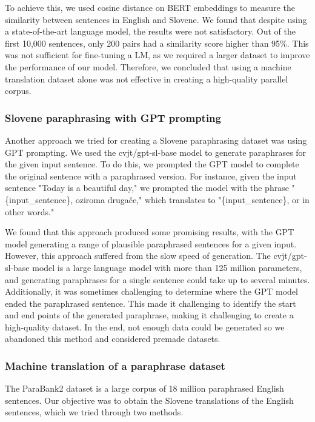 \documentclass[fleqn,moreauthors,10pt]{ds_report}
\begin{document}
To achieve this, we used cosine distance on BERT embeddings \cite{reimers-2019-sentence-bert} to measure the similarity between sentences in English and Slovene. We found that despite using a state-of-the-art language model, the results were not satisfactory. Out of the first 10,000 sentences, only 200 pairs had a similarity score higher than 95\%. This was not sufficient for fine-tuning a LM, as we required a larger dataset to improve the performance of our model. Therefore, we concluded that using a machine translation dataset alone was not effective in creating a high-quality parallel corpus.

\subsubsection*{Slovene paraphrasing with GPT prompting}
Another approach we tried for creating a Slovene paraphrasing dataset was using GPT prompting. We used the cvjt/gpt-sl-base model \cite{huggingface_gptslbase} to generate paraphrases for the given input sentence. To do this, we prompted the GPT model to complete the original sentence with a paraphrased version. For instance, given the input sentence "Today is a beautiful day," we prompted the model with the phrase "\{input\_sentence\}, oziroma drugače," which translates to "\{input\_sentence\}, or in other words."

We found that this approach produced some promising results, with the GPT model generating a range of plausible paraphrased sentences for a given input. However, this approach suffered from the slow speed of generation. The cvjt/gpt-sl-base model \cite{huggingface_gptslbase} is a large language model with more than 125 million parameters, and generating paraphrases for a single sentence could take up to several minutes. Additionally, it was sometimes challenging to determine where the GPT model ended the paraphrased sentence. This made it challenging to identify the start and end points of the generated paraphrase, making it challenging to create a high-quality dataset. In the end, not enough data could be generated so we abandoned this method and considered premade datasets.

\subsubsection*{Machine translation of a paraphrase dataset}
The ParaBank2 dataset \cite{hu2019parabank} is a large corpus of 18 million paraphrased English sentences. Our objective was to obtain the Slovene translations of the English sentences, which we tried through two methods.
\end{document}
